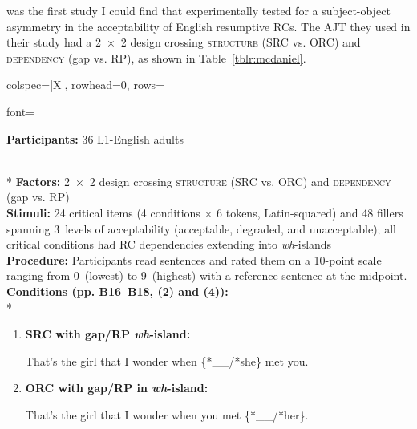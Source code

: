 
\textcite{mcdaniel.cowart1999} was the first study I could find that experimentally tested for a subject-object asymmetry in the acceptability of English resumptive RCs. The AJT they used in their study had a 2~×~2 design crossing \textsc{structure} (SRC vs. ORC) and \textsc{dependency} (gap vs. RP), as shown in Table~\ref{tblr:mcdaniel}.

\begin{longtblr}[caption={\textcite{mcdaniel.cowart1999}: Acceptability judgment task}, label={tblr:mcdaniel}]{colspec={|X|}, rowhead=0, rows={font=\raggedright{}}}\hline
\textbf{Participants:} 36 L1-English adults \vspace{5pt}\rule{0pt}{10pt}\\*
\textbf{Factors:} 2~×~2 design crossing \textsc{structure} (SRC vs. ORC) and \textsc{dependency} (gap vs. RP) \vspace{5pt}\\
\textbf{Stimuli:} 24 critical items (4 conditions × 6 tokens, Latin-squared) and 48 fillers spanning 3~levels of acceptability (acceptable, degraded, and unacceptable); all critical conditions had RC dependencies extending into \textit{wh}-islands \vspace{5pt}\\
\textbf{Procedure:} Participants read sentences and rated them on a 10-point scale ranging from 0~(lowest) to 9~(highest) with a reference sentence at the midpoint. \vspace{5pt}\\
\textbf{Conditions (pp. B16--B18, (2) and (4)):} \vspace{5pt}\\*
\begin{varwidth}{\linewidth}\begin{enumerate}[\bfseries (a),itemsep=5pt] 
\item \textbf{SRC with gap/RP \textit{wh}-island:}\par\nobreak
That's the girl that I wonder when \{*\_\_/*she\} met you.
\item \textbf{ORC with gap/RP in \textit{wh}-island:}\par\nobreak
That's the girl that I wonder when you met \{*\_\_/*her\}.
\end{enumerate}\end{varwidth}\\\hline
\end{longtblr}

